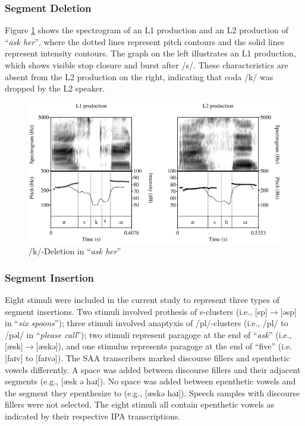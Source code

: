\subsubsection{Segment Deletion}

Figure \ref{fig:del} shows the spectrogram of an L1 production and an L2 production of “\textit{ask her}”, where the dotted lines represent pitch contours and the solid lines represent intensity contours. The graph on the left illustrates an L1 production, which shows visible stop closure and burst after /s/. These characteristics are absent from the L2 production on the right, indicating that coda /k/ was dropped by the L2 speaker.

\begin{figure}[h!]
  \figSpace
    \centering
	\includegraphics[width=1\textwidth]{figures/chp3/kdel.eps}
    \caption{/k/-Deletion in “\textit{ask her}”}
    \label{fig:del}
  \figSpace
\end{figure}

\subsubsection{Segment Insertion}

Eight stimuli were included in the current study to represent three types of segment insertions. Two stimuli involved prothesis of s-clusters (i.e., [sp]$\rightarrow$[əsp] in “\textit{six spoons}”); three stimuli involved anaptyxis of /pl/-clusters (i.e., /pl/ to /pəl/ in “\textit{please call}”); two stimuli represent paragoge at the end of “\textit{ask}” (i.e., [æsk]$\rightarrow$[æskə]), and one stimulus represents paragoge at the end of “five” (i.e. [faɪv] to [faɪvə]). The SAA transcribers marked discourse fillers and epenthetic vowels differently. A space was added between discourse fillers and their adjacent segments (e.g., [æsk ə həɹ]). No space was added between epenthetic vowels and the segment they epenthesize to (e.g., [æskə həɹ]). Speech samples with discourse fillers were not selected. The eight stimuli all contain epenthetic vowels as indicated by their respective IPA transcriptions. 

